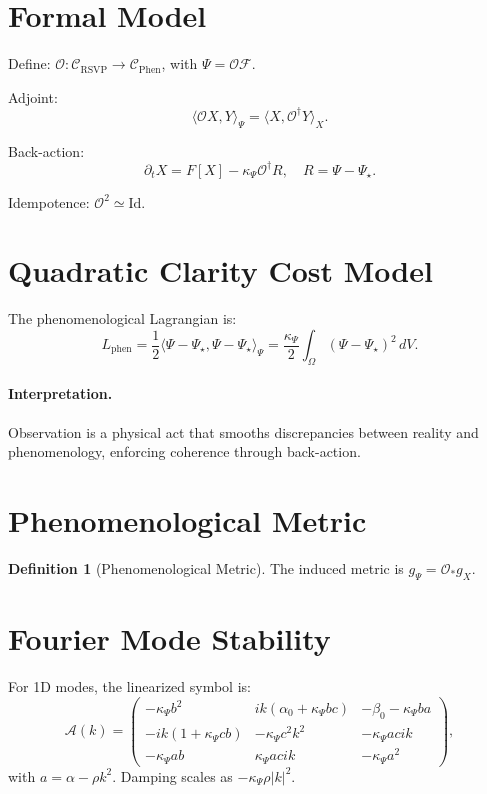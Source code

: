 \documentclass[12pt]{book}
\theoremstyle{definition}
\newtheorem{definition}{Definition}[chapter]
\begin{document}
\section{Formal Model}
Define: \(\mathcal{O}: \mathcal{C}_{\text{RSVP}} \to \mathcal{C}_{\text{Phen}}\), with \(\Psi = \mathcal{O} \mathcal{F}\).

Adjoint:
\begin{equation}
\langle \mathcal{O}X, Y \rangle_\Psi = \langle X, \mathcal{O}^\dagger Y \rangle_X.
\end{equation}

Back-action:
\begin{equation}
\partial_t X = F[X] - \kappa_\Psi \mathcal{O}^\dagger R, \quad R = \Psi - \Psi_\star.
\end{equation}

Idempotence: \(\mathcal{O}^2 \simeq \text{Id}\).

\section{Quadratic Clarity Cost Model}
The phenomenological Lagrangian is:
\begin{equation}
L_{\text{phen}} = \frac{1}{2} \langle \Psi - \Psi_\star, \Psi - \Psi_\star \rangle_\Psi = \frac{\kappa_\Psi}{2} \int_\Omega (\Psi - \Psi_\star)^2 \, dV.
\end{equation}

\paragraph{Interpretation.} Observation is a physical act that smooths discrepancies between reality and phenomenology, enforcing coherence through back-action.

\section{Phenomenological Metric}
\begin{definition}[Phenomenological Metric]
\label{def:pheno_metric}
The induced metric is \(g_\Psi = \mathcal{O}_* g_X\).
\end{definition}

\section{Fourier Mode Stability}
For 1D modes, the linearized symbol is:
\begin{equation}
\mathcal{A}(k) =
\begin{pmatrix}
-\kappa_\Psi b^2 & i k(\alpha_0 + \kappa_\Psi b c) & -\beta_0 - \kappa_\Psi b a \\
- i k(1 + \kappa_\Psi c b) & -\kappa_\Psi c^2 k^2 & - \kappa_\Psi a c i k \\
-\kappa_\Psi a b & \kappa_\Psi a c i k & -\kappa_\Psi a^2
\end{pmatrix},
\end{equation}
with \(a = \alpha - \rho k^2\). Damping scales as \(-\kappa_\Psi \rho |k|^2\).
\end{document}
